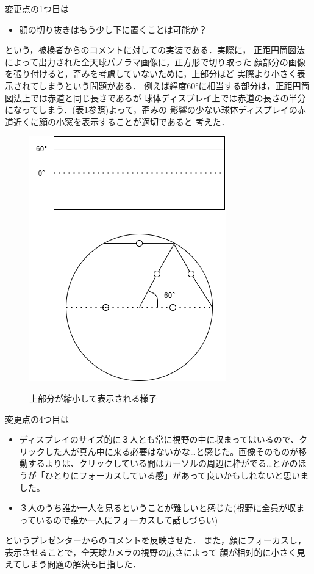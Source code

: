 変更点の1つ目は
\begin{itemize}
  \item 顔の切り抜きはもう少し下に置くことは可能か？
\end{itemize}
という，被検者からのコメントに対しての実装である．実際に，
正距円筒図法によって出力された全天球パノラマ画像に，正方形で切り取った
顔部分の画像を張り付けると，歪みを考慮していないために，上部分ほど
実際より小さく表示されてしまうという問題がある．
例えば緯度60°に相当する部分は，正距円筒図法上では赤道と同じ長さであるが
球体ディスプレイ上では赤道の長さの半分になってしまう．(表\ref{projection1}参照)よって，歪みの
影響の少ない球体ディスプレイの赤道近くに顔の小窓を表示することが適切であると
考えた．
\begin{figure}[tp]
  \centering
  \includegraphics[scale=0.7]{fig/projection1.png}\label{projection1}
  \caption{上部分が縮小して表示される様子}
\end{figure}

変更点の4つ目は
\begin{itemize}
  \item ディスプレイのサイズ的に３人とも常に視野の中に収まってはいるので、クリックした人が真ん中に来る必要はないかな…と感じた。画像そのものが移動するよりは、クリックしている間はカーソルの周辺に枠がでる…とかのほうが「ひとりにフォーカスしている感」があって良いかもしれないと思いました。
  \item ３人のうち誰か一人を見るということが難しいと感じた(視野に全員が収まっているので誰か一人にフォーカスして話しづらい)
\end{itemize}
というプレゼンターからのコメントを反映させた．
また，顔にフォーカスし，表示させることで，全天球カメラの視野の広さによって
顔が相対的に小さく見えてしまう問題の解決も目指した．

